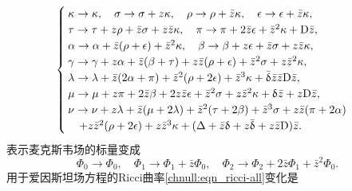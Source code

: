 \begin{equation}\label{chnull:eqn_Spin-I}
    \begin{cases}
        \kappa\to \kappa, \quad \sigma\to \sigma + z \kappa, \quad
        \rho \to \rho + \bar{z} \kappa, \quad \epsilon\to \epsilon +\bar{z}\kappa,\\
        \tau\to \tau + z \rho + \bar{z}\sigma + z\bar{z} \kappa,\quad
        \pi \to \pi + 2 \bar{z}\epsilon +\bar{z}^2 \kappa + {\rm D} \bar{z}, \\
        \alpha\to \alpha + \bar{z}(\rho +\epsilon) + \bar{z}^2\kappa,\quad
        \beta \to \beta + z \epsilon +\bar{z}\sigma + z\bar{z} \kappa, \\
        \gamma\to \gamma + z\alpha + \bar{z}(\beta + \tau ) + z\bar{z}(\rho+\epsilon)
        + \bar{z}^2\sigma + z\bar{z}^2\kappa,\\
        \lambda\to \lambda + \bar{z}(2\alpha + \pi)+ \bar{z}^2 (\rho+2\epsilon)
        + \bar{z}^3 \kappa + \bar{\updelta}\bar{z} \bar{z}{\rm D} \bar{z}, \\
        \mu\to \mu + z \pi +2 \bar{z}\beta +2z\bar{z}\epsilon +\bar{z}^2\sigma
        +z\bar{z}^2\kappa + \updelta \bar{z} + z{\rm D}\bar{z}, \\
        \nu \to \nu + z\lambda + \bar{z}(\mu+2\lambda) + \bar{z}^2 (\tau+2\beta)
        +\bar{z}^3\sigma + z\bar{z}(\pi+2\alpha) \\
        \quad +z\bar{z}^2 (\rho+2\epsilon) + z\bar{z}^3 \kappa
        +(\Delta + \bar{z}\updelta + z \bar{\updelta}+ z\bar{z}{\rm D})\bar{z} .
    \end{cases}
\end{equation}
表示麦克斯韦场的标量变成
\begin{equation}\label{chnull:eqn_Maxwell-I}
    \Phi_0\to \Phi_0,\quad \Phi_1\to \Phi_1 + \bar{z}\Phi_0, \quad
    \Phi_2 \to \Phi_2 + 2 \bar{z}\Phi_1 + \bar{z}^2 \Phi_0 .
\end{equation}
用于爱因斯坦场方程的Ricci曲率\eqref{chnull:eqn_ricci-all}变化是
